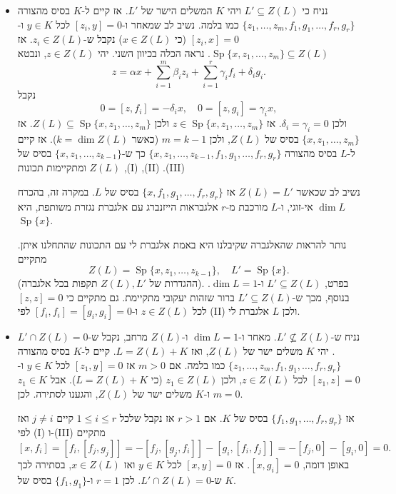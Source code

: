 \documentclass{report}
\makeatletter
\theoremstyle{break}
\theoremstyle{MyNonumberbreak}
\DeclareRobustCommand{\Eqref}[1]{\textup{\tagform@{\ref*{#1}}}}
\DeclareMathOperator{\Sp}{Sp}
\makeatother
\begin{document}
\begin{itemize}
	\item
	נניח כי $L' \subseteq Z(L)$ ויהי $K$ המשלים הישר של $L'$. אז קיים ל-$K$ בסיס מהצורה $\{z_1, \ldots, z_m, f_1, g_1, \ldots, f_r, g_r\}$ כמו בלמה. נשיב לב שמאחר ו-$[z_i, y] = 0$ לכל $y \in K$ ו-$[z_i, x] = 0$ (כי $x \in Z(L)$) נקבל ש-$z_i \in Z(L)$. אז $\Sp\{x, z_1, \ldots, z_m\} \subseteq Z(L)$. נראה הכלה בכיוון השני. יהי $z \in Z(L)$, ונבטא
	\[ z = \alpha x + \sum_{i=1}^m \beta_i z_i + \sum_{i=1}^r \gamma_i f_i + \delta_i g_i. \]
	נקבל
	\[ 0 = [z, f_i] = -\delta_ix, \quad 0 = [z, g_i] = \gamma_ix, \]
	ולכן $\delta_i = \gamma_i = 0$. אז $z \in \Sp\{x, z_1, \ldots, z_m\}$ ולכן $Z(L) \subseteq \Sp\{x, z_1, \ldots, z_m\}$. אז $\{x, z_1, \ldots, z_m\}$ בסיס של $Z(L)$, ולכן $m=k-1$ (כאשר $k = \dim Z(L)$). אז קיים ל-$L$ בסיס מהצורה $\{x, z_1, \ldots, z_{k-1}, f_1, g_1, \ldots, f_r, g_r\}$ כך ש-$\{x, z_1, \ldots, z_{k-1}\}$ בסיס של $Z(L)$ ומתקיימות תכונות	,(I) ,(II) .(III)
	
	נשיב לב שכאשר $Z(L) = L'$ אז $\{x, f_1, g_1, \ldots, f_r, g_r\}$ בסיס של $L$. במקרה זה, בהכרח $\dim L$ אי-זוגי, ו-$L$ מורכבת מ-$r$ אלגבראות הייזנברג עם אלגברת נגזרת משותפת, היא $\Sp\{x\}$.
	
	נותר להראות שהאלגברה שקיבלנו היא באמת אלגברת לי עם התכונות שהתחלנו איתן. מתקיים 
	\[ Z(L) = \Sp\{x, z_1, \ldots, z_{k-1}\}, \quad L' = \Sp\{x\}. \]
	(ההגדרות של $Z(L), L'$ תקפות בכל אלגברה). בפרט, $L' \subseteq Z(L)$ ו-$\dim L = 1$. בנוסף, מכך ש-$L' \subseteq Z(L)$ ברור שזהות יעקובי מתקיימת. גם \Eqref{eq:L1} מתקיים כי $[z, z] = 0$ לכל $z \in Z(L)$ ו-$[f_i, f_i] = [g_i, g_i] = 0$ לפי (II) ולכן $L$ אלגברת לי.
	\item
	נניח ש-$L' \not\subseteq Z(L)$. מאחר ו-$\dim L = 1$ ו-$Z(L)$ מרחב, נקבל ש-$L' \cap Z(L) = 0$. יהי $K$ משלים ישר של $Z(L)$, ואז $L = Z(L) + K$. קיים ל-$K$ בסיס מהצורה $\{z_1, \ldots, z_m, f_1, g_1, \ldots, f_r, g_r\}$ כמו בלמה. אם $m > 0$ אז $[z_1, y] = 0$ לכל $y \in K$ ו-$[z_1, z] = 0$ לכל $z \in Z(L)$, ולכן $z_1 \in Z(L)$ (כי $L = Z(L) + K$). אבל $z_1 \in K$ ו-$K$ משלים ישר של $Z(L)$, והגענו לסתירה. לכן $m = 0$. 
	
	אז $\{f_1, g_1, \ldots, f_r, g_r\}$ בסיס של $K$. אם $r > 1$ אז נקבל שלכל $1 \le i \le r$ קיים $j \neq i$ ואז לפי (I) ו-(III) מתקיים
	\[ [x, f_i] = [f_i, [f_j, g_j]] = -[f_j, [g_j, f_i]] - [g_i, [f_i, f_j]] = -[f_j, 0] - [g_i, 0] = 0. \]
	באופן דומה, $[x, g_i] = 0$. אז $[x, y] = 0$ לכל $y \in K$ ואז $x \in Z(L)$, בסתירה לכך ש-$L' \cap Z(L) = 0$. לכן $r = 1$ ו-$\{f_1, g_1\}$ בסיס של $K$.
	

\end{itemize}
\end{document}
